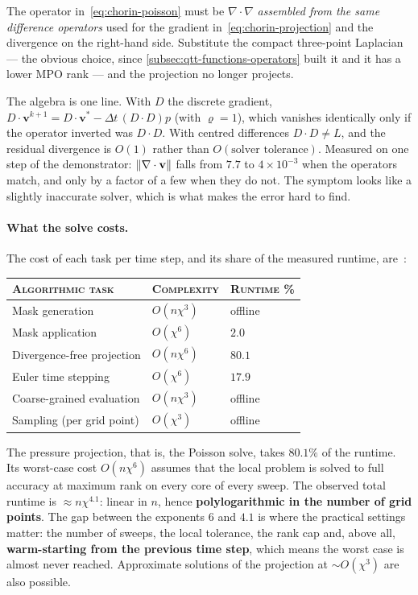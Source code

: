 \begin{remark}
  The operator in~\eqref{eq:chorin-poisson} must be $\nabla\cdot\nabla$
  \emph{assembled from the same difference operators} used for the gradient
  in~\eqref{eq:chorin-projection} and the divergence on the right-hand side.
  Substitute the compact three-point Laplacian --- the obvious choice, since
  \cref{subsec:qtt-functions-operators} built it and it has a lower MPO rank ---
  and the projection no longer projects.

  The algebra is one line. With $D$ the discrete gradient,
  $D\cdot\mathbf{v}^{k+1} = D\cdot\mathbf{v}^{*} - \Delta t\,(D\cdot D)p$ (with
  $\varrho = 1$), which vanishes identically only if the operator inverted was
  $D\cdot D$. With centred differences $D\cdot D \ne L$, and the residual
  divergence is $O(1)$ rather than $O(\text{solver tolerance})$. Measured on one
  step of the demonstrator: $\left\|\nabla\cdot\mathbf{v}\right\|$ falls from $7.7$ to
  $4\times10^{-3}$ when the operators match, and only by a factor of a few when
  they do not. The symptom looks like a slightly inaccurate solver, which is
  what makes the error hard to find.
\end{remark}

\paragraph{What the solve costs.}
The cost of each task per time step, and its share of the measured runtime,
are~\cite{Peddinti2024}:
\begin{center}
  \begin{tabular}{@{}lll@{}}
    \toprule
    \textsc{Algorithmic task} & \textsc{Complexity} & \textsc{Runtime \%} \\
    \midrule
    Mask generation             & $O(n\chi^3)$ & offline \\
    Mask application            & $O(\chi^6)$  & $2.0$ \\
    Divergence-free projection  & $O(n\chi^6)$ & $\mathbf{80.1}$ \\
    Euler time stepping         & $O(\chi^6)$  & $17.9$ \\
    Coarse-grained evaluation   & $O(n\chi^3)$ & offline \\
    Sampling (per grid point)   & $O(\chi^3)$  & offline \\
    \bottomrule
  \end{tabular}
\end{center}
\noindent
The pressure projection, that is, the Poisson solve, takes $80.1\%$ of the
runtime. Its worst-case cost $O(n\chi^6)$ assumes that the local problem is
solved to full accuracy at maximum rank on every core of every sweep. The
observed total runtime is $\approx n\chi^{4.1}$: linear in $n$, hence
\textbf{polylogarithmic in the number of grid points}. The gap between the
exponents $6$ and $4.1$ is where the practical settings matter: the number of
sweeps, the local tolerance, the rank cap and, above all, \textbf{warm-starting
from the previous time step}, which means the worst case is almost never
reached. Approximate solutions of the projection at $\sim O(\chi^3)$ are also
possible.


